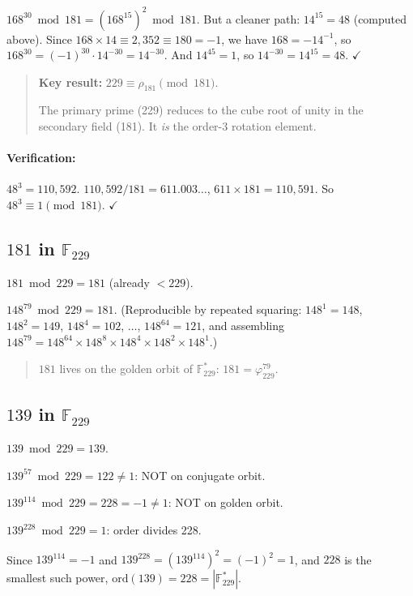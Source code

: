 $168^{30} \bmod 181 = (168^{15})^2 \bmod 181$.
But a cleaner path: $14^{15} = 48$ (computed above). Since $168 \times 14 \equiv 2{,}352
\equiv 180 = -1$, we have $168 = -14^{-1}$, so $168^{30} = (-1)^{30} \cdot 14^{-30}
= 14^{-30}$. And $14^{45} = 1$, so $14^{-30} = 14^{15} = 48$. $\checkmark$

\begin{quote}
\textbf{Key result:} $229 \equiv \rho_{181} \pmod{181}$.

The primary prime (229) reduces to the cube root of unity in the
secondary field (181). It \emph{is} the order-3 rotation element.
\end{quote}

\paragraph{Verification:} $48^3 = 110{,}592$. $110{,}592 / 181 = 611.003\ldots$,
$611 \times 181 = 110{,}591$. So $48^3 \equiv 1 \pmod{181}$. $\checkmark$

\subsection{$181$ in $\mathbb{F}_{229}$}

$181 \bmod 229 = 181$ (already $< 229$).

$148^{79} \bmod 229 = 181$.
(Reproducible by repeated squaring: $148^1 = 148$, $148^2 = 149$,
$148^4 = 102$, $\ldots$, $148^{64} = 121$, and assembling
$148^{79} = 148^{64} \times 148^8 \times 148^4 \times 148^2 \times 148^1$.)

\begin{quote}
$181$ lives on the golden orbit of $\mathbb{F}_{229}^*$:
$181 = \varphi_{229}^{79}$.
\end{quote}

\subsection{$139$ in $\mathbb{F}_{229}$}

$139 \bmod 229 = 139$.

$139^{57} \bmod 229 = 122 \neq 1$: NOT on conjugate orbit.

$139^{114} \bmod 229 = 228 = -1 \neq 1$: NOT on golden orbit.

$139^{228} \bmod 229 = 1$: order divides 228.

Since $139^{114} = -1$ and $139^{228} = (139^{114})^2 = (-1)^2 = 1$,
and $228$ is the smallest such power, $\mathrm{ord}(139) = 228 = |\mathbb{F}_{229}^*|$.

